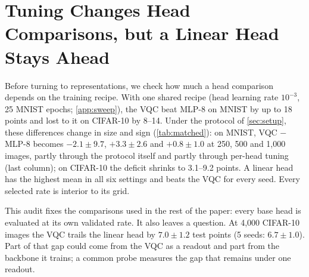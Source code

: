 \section{Tuning Changes Head Comparisons, but a Linear Head Stays Ahead}
\label{sec:tuning}



Before turning to representations, we check how much a head comparison depends on the training
recipe. With one shared recipe (head learning rate $10^{-3}$, 25 MNIST epochs; \cref{app:sweep}), the
VQC beat MLP-8 on MNIST by up to 18 points and lost to it on CIFAR-10 by 8--14. Under the protocol of
\cref{sec:setup}, these differences change in size and sign (\cref{tab:matched}): on MNIST, VQC
$-$ MLP-8 becomes $-2.1\pm9.7$, $+3.3\pm2.6$ and $+0.8\pm1.0$ at 250, 500 and 1,000 images, partly
through the protocol itself and partly through per-head tuning (last column); on CIFAR-10 the deficit
shrinks to 3.1--9.2 points. A linear head has the highest mean in all six settings and beats the VQC
for every seed. Every selected rate is interior to its grid.

This audit fixes the comparisons used in the rest of the paper: every base head is evaluated at
its own validated rate. It also leaves a question. At 4,000 CIFAR-10 images the
VQC trails the linear head by $7.0\pm1.2$ test points (5 seeds: $6.7\pm1.0$). Part of that
gap could come from the VQC as a readout and part from the backbone it trains; a common probe
measures the gap that remains under one readout.
